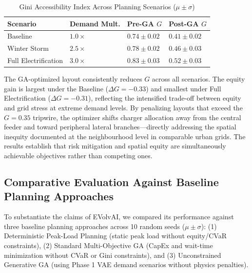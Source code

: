 \documentclass[conference]{IEEEtran}
\begin{document}
\begin{table}[!t]
  \centering
  \caption{Gini Accessibility Index Across Planning Scenarios ($\mu \pm \sigma$)}
  \label{tab:gini}
  \begin{tabular}{@{}llll@{}}
    \toprule
    \textbf{Scenario} & \textbf{Demand Mult.} & \textbf{Pre-GA $G$} & \textbf{Post-GA $G$} \\
    \midrule
    Baseline              & $1.0\times$ & $0.74 \pm 0.02$ & $0.41 \pm 0.02$ \\
    Winter Storm          & $2.5\times$ & $0.78 \pm 0.02$ & $0.46 \pm 0.03$ \\
    Full Electrification  & $3.0\times$ & $0.83 \pm 0.03$ & $0.52 \pm 0.03$ \\
    \bottomrule
  \end{tabular}
\end{table}

The GA-optimized layout consistently reduces $G$ across all scenarios. The equity gain is largest under the Baseline ($\Delta G = -0.33$) and smallest under Full Electrification ($\Delta G = -0.31$), reflecting the intensified trade-off between equity and grid stress at extreme demand levels. By penalizing layouts that exceed the $G = 0.35$ tripwire, the optimizer shifts charger allocation away from the central feeder and toward peripheral lateral branches---directly addressing the spatial inequity documented at the neighbourhood level in comparable urban grids. The results establish that risk mitigation and spatial equity are simultaneously achievable objectives rather than competing ones.

\subsection{Comparative Evaluation Against Baseline Planning Approaches}

To substantiate the claims of EVolvAI, we compared its performance against three baseline planning approaches across 10 random seeds ($\mu \pm \sigma$): (1) Deterministic Peak-Load Planning (static peak load without equity/CVaR constraints), (2) Standard Multi-Objective GA (CapEx and wait-time minimization without CVaR or Gini constraints), and (3) Unconstrained Generative GA (using Phase 1 VAE demand scenarios without physics penalties).
\end{document}

